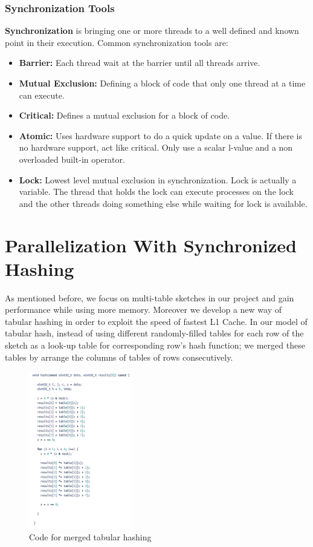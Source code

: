 \documentclass[twoside]{article}
\begin{document}
\subsubsection{Synchronization Tools}
\textbf{Synchronization} is bringing one or more threads to a well defined and known point in their execution. Common synchronization tools are:
\begin{itemize}
	\item \textbf{Barrier:} Each thread wait at the barrier until all threads arrive.
	\item \textbf{Mutual Exclusion:} Defining a block of code that only one thread at a time can execute.
	\item \textbf{Critical:} Defines a mutual exclusion for a block of code.
	\item \textbf{Atomic:} Uses hardware support to do a quick update on a value. If there is no hardware support, act like critical. Only use a scalar l-value and a non overloaded built-in operator.
	\item \textbf{Lock:} Lowest level mutual exclusion in synchronization. Lock is actually a variable. The thread that holds the lock can execute processes on the lock and the other threads doing something else while waiting for lock is available. 
	
\end{itemize}

\section{Parallelization With Synchronized Hashing}
As mentioned before, we focus on multi-table sketches in our project and gain performance while using more memory. Moreover we develop a new way of tabular hashing in order to exploit the speed of fastest L1 Cache. In our model of tabular hash, instead of using different randomly-filled tables for each row of the sketch as a look-up table for corresponding row's hash function; we merged these tables by arrange the columns of tables of rows consecutively.
\begin{figure}[H]
	\centering
	\includegraphics[width=0.4\textwidth]{mergedhasher.png}
	\caption{Code for merged tabular hashing}
	
	\label{fig:code}
\end{figure}
\end{document}
